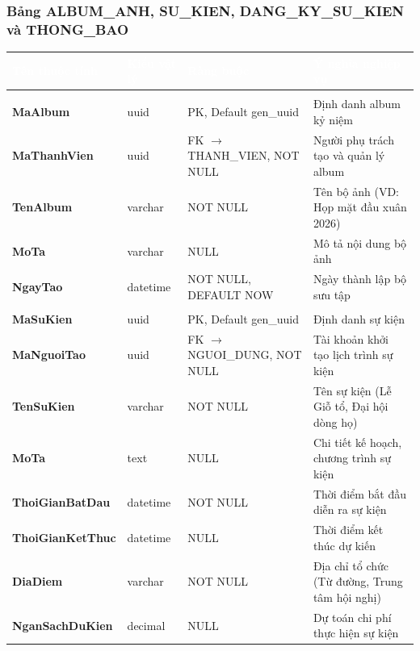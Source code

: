 \subsubsection{Bảng ALBUM\_ANH, SU\_KIEN, DANG\_KY\_SU\_KIEN và THONG\_BAO}
\begin{table}[H]
\centering\small
\renewcommand{\arraystretch}{1.3}
\begin{tabularx}{\textwidth}{|>{\raggedright\arraybackslash\bfseries}p{3.2cm}|>{\raggedright\arraybackslash}p{2.3cm}|>{\raggedright\arraybackslash}p{3.2cm}|>{\raggedright\arraybackslash}X|}
\hline
\rowcolor{tableheader}
\textcolor{white}{\textbf{Tên thuộc tính}} & \textcolor{white}{\textbf{Kiểu vật lý}} & \textcolor{white}{\textbf{Ràng buộc}} & \textcolor{white}{\textbf{Ý nghĩa nghiệp vụ}} \\
\hline
\multicolumn{4}{|l|}{\cellcolor{softblue}\textbf{Bảng ALBUM\_ANH (Kho ảnh gia tộc)}} \\
\hline
MaAlbum & uuid & PK, Default gen\_uuid & Định danh album kỷ niệm \\
\hline
MaThanhVien & uuid & FK $\to$ THANH\_VIEN, NOT NULL & Người phụ trách tạo và quản lý album \\
\hline
TenAlbum & varchar & NOT NULL & Tên bộ ảnh (VD: Họp mặt đầu xuân 2026) \\
\hline
MoTa & varchar & NULL & Mô tả nội dung bộ ảnh \\
\hline
NgayTao & datetime & NOT NULL, DEFAULT NOW & Ngày thành lập bộ sưu tập \\
\hline
\multicolumn{4}{|l|}{\cellcolor{softblue}\textbf{Bảng SU\_KIEN (Sự kiện dòng họ)}} \\
\hline
MaSuKien & uuid & PK, Default gen\_uuid & Định danh sự kiện \\
\hline
MaNguoiTao & uuid & FK $\to$ NGUOI\_DUNG, NOT NULL & Tài khoản khởi tạo lịch trình sự kiện \\
\hline
TenSuKien & varchar & NOT NULL & Tên sự kiện (Lễ Giỗ tổ, Đại hội dòng họ) \\
\hline
MoTa & text & NULL & Chi tiết kế hoạch, chương trình sự kiện \\
\hline
ThoiGianBatDau & datetime & NOT NULL & Thời điểm bắt đầu diễn ra sự kiện \\
\hline
ThoiGianKetThuc & datetime & NULL & Thời điểm kết thúc dự kiến \\
\hline
DiaDiem & varchar & NOT NULL & Địa chỉ tổ chức (Từ đường, Trung tâm hội nghị) \\
\hline
NganSachDuKien & decimal & NULL & Dự toán chi phí thực hiện sự kiện \\

\end{tabularx}
\end{table}
